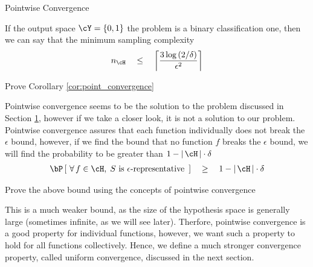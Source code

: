 \documentclass{article}
\begin{document}
\begin{ssection}[2]{Pointwise Convergence}
	\begin{corollary}
		If the output space $\cY = \set{0, 1}$ \ie the problem is a binary classification one, then we can say that the minimum sampling complexity
		\begin{align*}
			n_\cH	\qle	\ceil{\frac{3 \log{2 / \delta}}{\epsilon^2}}
		\end{align*}
	\end{corollary}

	\begin{exercise}
		Prove Corollary \ref{cor:point_convergence}

	\end{exercise}

	Pointwise convergence seems to be the solution to the problem discussed in Section \hyperlink{sec:1}{1}, however if we take a closer look, it is not a solution to our problem. Pointwise convergence assures that each function individually does not break the $\epsilon$ bound, however, if we find the bound that no function $f$ breaks the $\epsilon$ bound, we will find the probability to be greater than $1 - \abs{\cH} \cdot \delta$ \, \ie
	\begin{align*}
		\prob{\qforall f \in \cH, \; S \qmt{is} \epsilon\mt{-representative}}	\qge	1 - \abs{\cH} \cdot \delta
	\end{align*}

	\begin{exercise}
		Prove the above bound using the concepts of pointwise convergence
	\end{exercise}

	This is a much weaker bound, as the size of the hypothesis space is generally large (sometimes infinite, as we will see later). Therfore, pointwise convergence is a good property for individual functions, however, we want such a property to hold for all functions collectively. Hence, we define a much stronger convergence property, called uniform convergence, discussed in the next section. \br

\end{ssection}
\end{document}
